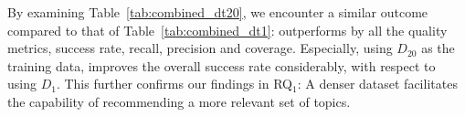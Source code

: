 By examining Table~\ref{tab:combined_dt20}, we encounter a similar outcome compared to that of Table~\ref{tab:combined_dt1}: \TF outperforms \MNB by all the quality metrics, \ie success rate, recall, precision and coverage. Especially, using $D_{20}$ as the training data, \TF improves the overall success rate considerably, with respect to using $D_{1}$. This further confirms our findings in RQ$_1$: A denser dataset facilitates the capability of recommending a more relevant set of topics. %












